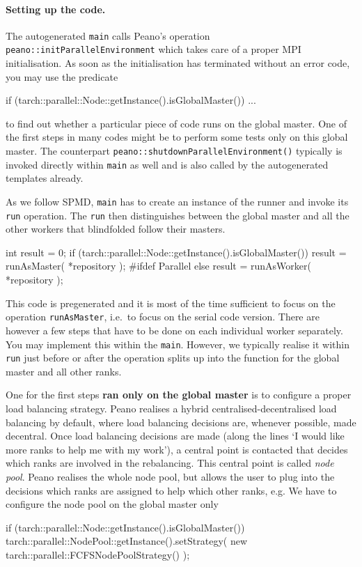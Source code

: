 \paragraph{Setting up the code.}

The autogenerated \texttt{main} calls Peano's operation \newline
\texttt{peano::initParallelEnvironment} which takes care of a proper MPI
initialisation. 
As soon as the initialisation has terminated without an error code, you may use
the predicate

\begin{code}
if (tarch::parallel::Node::getInstance().isGlobalMaster()) {
  ...
}
\end{code}

\noindent
to find out whether a particular piece of code runs on the global master. 
One of the first steps in many codes might be to perform some tests only on this
global master.
The counterpart \texttt{peano::shutdownParallelEnvironment()} typically is
invoked directly within \texttt{main} as well and is also called by the
autogenerated templates already.

As we follow SPMD, \texttt{main} has to create an instance of the runner and
invoke its \texttt{run} operation. 
The \texttt{run} then distinguishes between the global master and all the other
workers that blindfolded follow their masters. 
\begin{code}
  int result = 0;
  if (tarch::parallel::Node::getInstance().isGlobalMaster()) {
    result = runAsMaster( *repository );
  }
  #ifdef Parallel
  else {
    result = runAsWorker( *repository );
  }
\end{code}

\noindent
This code is pregenerated and it is most of the time sufficient to focus on the
operation \texttt{runAsMaster}, i.e.~to focus on the serial code version. There
are however a few steps that have to be done on each individual worker
separately. 
You may implement this within the \texttt{main}.
However, we typically realise it within \texttt{run} just before or after the
operation splits up into the function for the global master and all other ranks.


One for the first steps {\bf ran only on the global master} is to configure a
proper load balancing strategy. 
Peano realises a hybrid centralised-decentralised load balancing by default,
where load balancing decisions are, whenever possible, made decentral. 
Once load balancing decisions are made (along the lines `I would like more
ranks to help me with my work'), a central point is contacted that decides which
ranks are involved in the rebalancing.
This central point is called {\em node pool}.
Peano realises the whole node pool, but allows the user to plug into the
decisions which ranks are assigned to help which other ranks, e.g.
We have to configure the node pool on the global master only
\begin{code}
if (tarch::parallel::Node::getInstance().isGlobalMaster()) {
  tarch::parallel::NodePool::getInstance().setStrategy(
    new tarch::parallel::FCFSNodePoolStrategy()
  );
}
\end{code}

